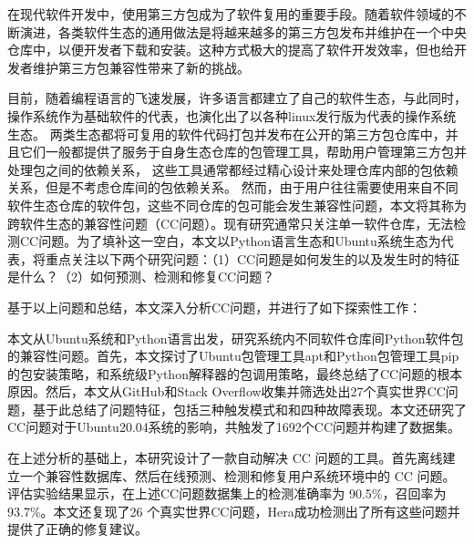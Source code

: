 \begin{cabstract}
在现代软件开发中，使用第三方包成为了软件复用的重要手段。随着软件领域的不断演进，各类软件生态的通用做法是将越来越多的第三方包发布并维护在一个中央仓库中，以便开发者下载和安装。这种方式极大的提高了软件开发效率，但也给开发者维护第三方包兼容性带来了新的挑战。

目前，随着编程语言的飞速发展，许多语言都建立了自己的软件生态，与此同时，操作系统作为基础软件的代表，也演化出了以各种linux发行版为代表的操作系统生态。
两类生态都将可复用的软件代码打包并发布在公开的第三方包仓库中，并且它们一般都提供了服务于自身生态仓库的包管理工具，帮助用户管理第三方包并处理包之间的依赖关系，
这些工具通常都经过精心设计来处理仓库内部的包依赖关系，但是不考虑仓库间的包依赖关系。
然而，由于用户往往需要使用来自不同软件生态仓库的软件包，这些不同仓库的包可能会发生兼容性问题，本文将其称为跨软件生态的兼容性问题（CC问题）。现有研究通常只关注单一软件仓库，无法检测CC问题。为了填补这一空白，本文以Python语言生态和Ubuntu系统生态为代表，将重点关注以下两个研究问题：（1）CC问题是如何发生的以及发生时的特征是什么？（2）如何预测、检测和修复CC问题？

基于以上问题和总结，本文深入分析CC问题，并进行了如下探索性工作：
\begin{compactitem}
	\item 本文从Ubuntu系统和Python语言出发，研究系统内不同软件仓库间Python软件包的兼容性问题。首先，本文探讨了Ubuntu包管理工具apt和Python包管理工具pip的包安装策略，和系统级Python解释器的包调用策略，最终总结了CC问题的根本原因。然后，本文从GitHub和Stack Overflow收集并筛选处出27个真实世界CC问题，基于此总结了问题特征，包括三种触发模式和和四种故障表现。本文还研究了CC问题对于Ubuntu20.04系统的影响，共触发了1692个CC问题并构建了数据集。
	\item 在上述分析的基础上，本研究设计了一款自动解决 CC 问题的工具\tool{}。\tool{}首先离线建立一个兼容性数据库、然后在线预测、检测和修复用户系统环境中的 CC 问题。评估实验结果显示，\tool{}在上述CC问题数据集上的检测准确率为 90.5\%，召回率为 93.7\%。本文还复现了26 个真实世界CC问题，Hera成功检测出了所有这些问题并提供了正确的修复建议。
\end{compactitem}
\end{cabstract}

\newpage
\mbox{}
\newpage

